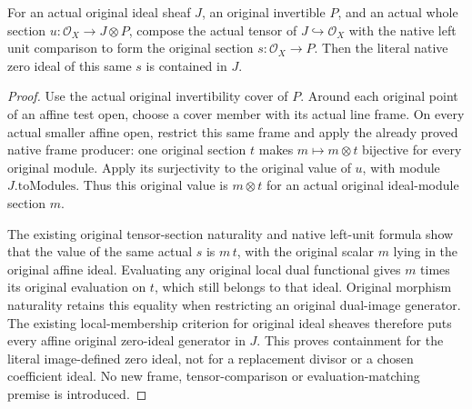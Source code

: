 \begin{lemma}
\label{lem:projective-original-ideal-twist-zero-ideal-contained}
For an actual original ideal sheaf $J$, an original invertible $P$, and
an actual whole section $u:\mathcal O_X\to J\otimes P$, compose the
actual tensor of $J\hookrightarrow\mathcal O_X$ with the native left
unit comparison to form the original section $s:\mathcal O_X\to P$.
Then the literal native zero ideal of this same $s$ is contained in $J$.
\end{lemma}
\begin{proof}
Use the actual original invertibility cover of $P$. Around each original
point of an affine test open, choose a cover member with its actual line
frame. On every actual smaller affine open, restrict this same frame and
apply the already proved native frame producer: one original section
$t$ makes $m\mapsto m\otimes t$ bijective for every original module.
Apply its surjectivity to the original value of $u$, with module
$J.\mathrm{toModules}$. Thus this original value is $m\otimes t$ for an
actual original ideal-module section $m$.

The existing original tensor-section naturality and native left-unit
formula show that the value of the same actual $s$ is $m\,t$, with the
original scalar $m$ lying in the original affine ideal. Evaluating any
original local dual functional gives $m$ times its original evaluation
on $t$, which still belongs to that ideal. Original morphism naturality
retains this equality when restricting an original dual-image generator.
The existing local-membership criterion for original ideal sheaves
therefore puts every affine original zero-ideal generator in $J$.
This proves containment for the literal image-defined zero ideal, not
for a replacement divisor or a chosen coefficient ideal. No new frame,
tensor-comparison or evaluation-matching premise is introduced.
\end{proof}

